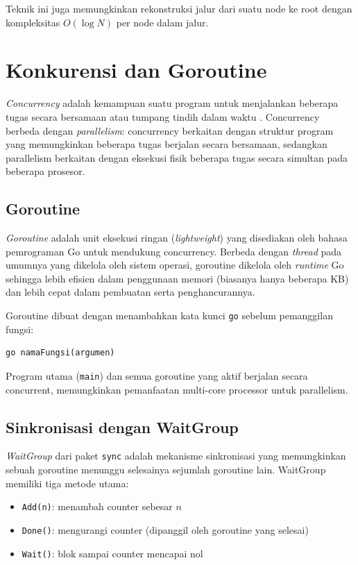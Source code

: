Teknik ini juga memungkinkan rekonstruksi jalur dari suatu node ke root dengan
kompleksitas $O(\log N)$ per node dalam jalur.

\section{Konkurensi dan Goroutine}

\textit{Concurrency} adalah kemampuan suatu program untuk menjalankan beberapa
tugas secara bersamaan atau tumpang tindih dalam waktu \cite{donovan2015go}.
Concurrency berbeda dengan \textit{parallelism}: concurrency berkaitan dengan
struktur program yang memungkinkan beberapa tugas berjalan secara bersamaan,
sedangkan parallelism berkaitan dengan eksekusi fisik beberapa tugas secara
simultan pada beberapa prosesor.

\subsection{Goroutine}

\textit{Goroutine} adalah unit eksekusi ringan (\textit{lightweight}) yang
disediakan oleh bahasa pemrograman Go untuk mendukung concurrency. Berbeda dengan
\textit{thread} pada umumnya yang dikelola oleh sistem operasi, goroutine
dikelola oleh \textit{runtime} Go sehingga lebih efisien dalam penggunaan memori
(biasanya hanya beberapa KB) dan lebih cepat dalam pembuatan serta penghancurannya.

Goroutine dibuat dengan menambahkan kata kunci \texttt{go} sebelum pemanggilan
fungsi:
\begin{verbatim}
go namaFungsi(argumen)
\end{verbatim}

Program utama (\texttt{main}) dan semua goroutine yang aktif berjalan secara
concurrent, memungkinkan pemanfaatan multi-core processor untuk parallelism.

\subsection{Sinkronisasi dengan WaitGroup}

\textit{WaitGroup} dari paket \texttt{sync} adalah mekanisme sinkronisasi yang
memungkinkan sebuah goroutine menunggu selesainya sejumlah goroutine lain.
WaitGroup memiliki tiga metode utama:
\begin{itemize}
    \item \texttt{Add(n)}: menambah counter sebesar $n$
    \item \texttt{Done()}: mengurangi counter (dipanggil oleh goroutine yang
    selesai)
    \item \texttt{Wait()}: blok sampai counter mencapai nol
\end{itemize}

